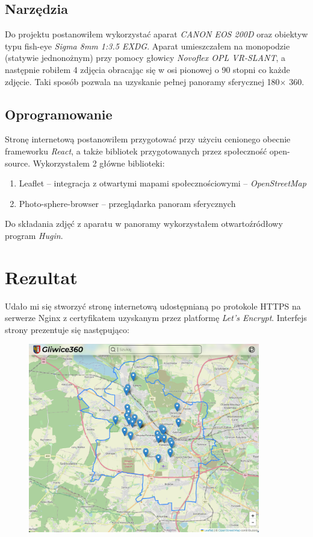 \documentclass[a4paper]{mwart}
\begin{document}
\subsection{Narzędzia}
Do projektu postanowiłem wykorzystać aparat \textit{CANON EOS 200D} oraz
obiektyw typu fish-eye \textit{Sigma 8mm 1:3.5 EXDG}. Aparat umieszczałem na 
monopodzie (statywie jednonożnym) przy pomocy głowicy
\textit{Novoflex OPL VR-SLANT}, a następnie robiłem 4 zdjęcia obracając się w 
osi pionowej o 90 stopni co każde zdjęcie. Taki sposób pozwala na uzyskanie
pełnej panoramy sferycznej 180\degree \(\times \) 360\degree.

\subsection{Oprogramowanie}
Stronę internetową postanowiłem przygotować przy użyciu cenionego obecnie
frameworku \textit{React}, a także bibliotek przygotowanych przez społeczność
open-source. Wykorzystałem 2 główne biblioteki: 
\begin{enumerate}
    \item Leaflet -- integracja z otwartymi mapami społecznościowymi -- \textit{OpenStreetMap}
    \item Photo-sphere-browser -- przeglądarka panoram sferycznych
\end{enumerate}

Do składania zdjęć z aparatu w panoramy wykorzystałem otwartoźródłowy program
\textit{Hugin}.


\section{Rezultat}
Udało mi się stworzyć stronę internetową udostępnianą po protokole HTTPS na
serwerze Nginx z certyfikatem uzyskanym przez platformę \textit{Let's Encrypt}. 
Interfejs strony prezentuje się następująco:
\begin{figure}[H]
\centering
\includegraphics[width=0.9\textwidth]{images/main.jpg}
\end{figure}
\end{document}
